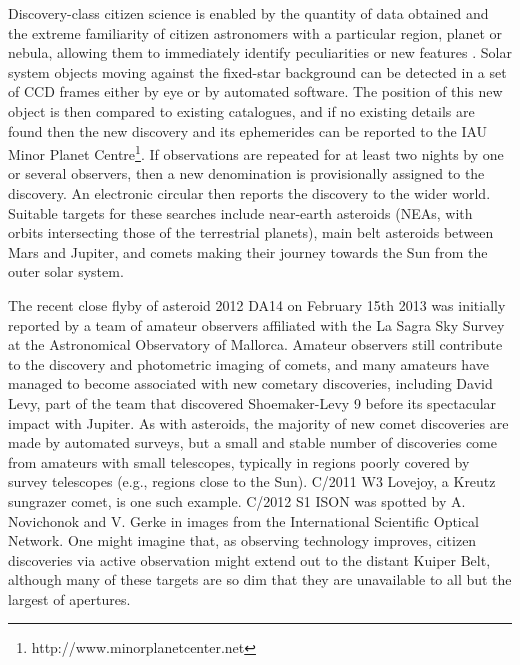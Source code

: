 \documentclass{ar2e}
\begin{document}
Discovery-class citizen science is enabled by the quantity of data obtained
and the extreme familiarity of citizen astronomers with a particular region,
planet or nebula, allowing them to immediately identify peculiarities or new
features \citep[e.g., meteorological activity on giant planets,][]{95rogers}. 
Solar system objects moving against the fixed-star background can be detected
in a set of CCD frames either by eye or by automated software.  The position
of this new object is then compared to existing catalogues, and if no existing
details are found then the new discovery and its ephemerides can be reported
to the IAU Minor Planet Centre\footnote{http://www.minorplanetcenter.net}.  If
observations are repeated for at least two nights by one or several observers,
then a new denomination is provisionally assigned to the discovery.   An
electronic circular then reports the discovery to the wider world.  Suitable
targets for these searches include near-earth asteroids (NEAs, with orbits
intersecting those of the terrestrial planets), main belt asteroids between
Mars and Jupiter, and comets making their journey towards the Sun from the
outer solar system.  

The recent close flyby of asteroid 2012 DA14 on February 15th 2013 was
initially reported by a team of amateur observers affiliated with the La Sagra
Sky Survey at the Astronomical Observatory of Mallorca.  Amateur observers
still contribute to the discovery and photometric imaging of comets, and many
amateurs have managed to become associated with new cometary discoveries,
including David Levy, part of the team that discovered Shoemaker-Levy 9 before
its spectacular impact with Jupiter.  As with asteroids, the majority of new
comet discoveries are made by automated surveys, but a small and stable number
of discoveries come from amateurs with small telescopes, typically in regions
poorly covered by survey telescopes (e.g., regions close to the Sun).  C/2011
W3 Lovejoy, a Kreutz sungrazer comet, is one such example.  C/2012 S1 ISON was
spotted by A. Novichonok and V. Gerke in images from the International
Scientific Optical Network.  One might imagine that, as observing technology
improves, citizen discoveries via active observation might extend out to the
distant Kuiper Belt, although many of these targets are so dim that they are
unavailable to all but the largest of apertures.
\end{document}
